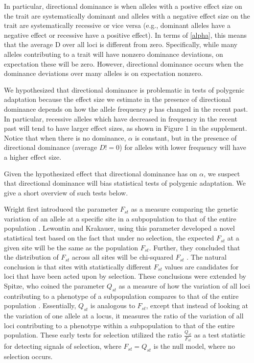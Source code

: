 \documentclass[a4paper,12pt]{article}
\begin{document}
In particular, directional dominance is when alleles with a postive effect
size on the trait are systematically dominant and alleles with a
negative effect size on the trait are systematically recessive or vice
versa (e.g., dominant alleles have a negative effect or recessive have
a positive effect). In terms of \eqref{alpha}, this means that the
average D over all loci is different from zero. Specifically, while
many alleles contributing to a trait will have nonzero dominance
deviations, on expectation these will be zero. However, directional
dominance occurs when the dominance deviations over many alleles is on
expectation nonzero.

We hypothesized that directional dominance is problematic in tests of polygenic adaptation
because the effect size we estimate in the presence of directional
dominance depends on how the allele frequency $p$ has changed in the
recent past. In particular, recessive alleles which have decreased in frequency
in the recent past will tend to have larger effect sizes, as shown in
Figure 1 in the supplement. Notice that when there is no dominance,
$\alpha$ is constant, but in the presence of directional dominance
(average $D!=0$) for alleles with lower frequency will have a higher
effect size. 

Given the hypothesized effect that directional dominance has on
$\alpha$, we suspect that directional dominance will bias statistical
tests of polygenic adaptation. We give a short overview of such tests
below.  

Wright first introduced the parameter $F_{st}$ as a measure comparing
the genetic variation of an allele at a specific site in a subpopulation to that of the entire population
\cite{Fst}. Lewontin and Krakauer, using this parameter developed a
novel statistical test based on the fact
that under no selection, the expected $F_{st}$ at a given site will be the same
as the population $F_{st}$. Further, they concluded that the
distribution of $F_{st}$ across all sites will be chi-squared
$F_{st}$ \cite{firstseltest}. The natural conclusion is that sites
with statistically different $F_{st}$ values are candidates for loci
that have been acted upon by selection. These conclusions were extended by Spitze, who coined the
parameter $Q_{st}$ as a measure of how the variation of all loci
contributing to a phenotype of a subpopulation compares to that of the entire
population \cite{Qst}. Essentially, $Q_{st}$ is analogous to $F_{st}$,
except that instead of looking at the variation of one allele at a
locus, it measures the ratio of the variation of all loci contributing to a
phenotype within a subpopulation to that of the entire population. These early tests for selection utilized the ratio
$\frac{Q_{st}}{F_{st}}$ as a test statistic for detecting signals of
selection, where $F_{st} = Q_{st}$ is the null model, where no
selection occurs.
\end{document}
